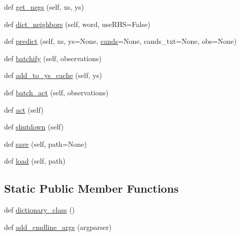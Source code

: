 \begin{DoxyCompactItemize}
\item 
def \hyperlink{classkvmemnn_1_1KvmemnnAgent_aef9979d74efe7a62ac7d4dc8cc661e30}{get\+\_\+negs} (self, xs, ys)
\item 
def \hyperlink{classkvmemnn_1_1KvmemnnAgent_a7bc63414bd5f081ad88caadcc5ec543d}{dict\+\_\+neighbors} (self, word, use\+R\+HS=False)
\item 
def \hyperlink{classkvmemnn_1_1KvmemnnAgent_ac2b07b1455920e6a343271997b9c6207}{predict} (self, xs, ys=None, \hyperlink{classkvmemnn_1_1KvmemnnAgent_a30dfea4410f97b8a0cf44e0a374f3a62}{cands}=None, cands\+\_\+txt=None, obs=None)
\item 
def \hyperlink{classkvmemnn_1_1KvmemnnAgent_ac7dba84c37dab7ef33f52d263fbdbdc7}{batchify} (self, observations)
\item 
def \hyperlink{classkvmemnn_1_1KvmemnnAgent_a0326f13fa94d1e9156e761c14dbcb536}{add\+\_\+to\+\_\+ys\+\_\+cache} (self, ys)
\item 
def \hyperlink{classkvmemnn_1_1KvmemnnAgent_a2a2c0f653125850d739b84e0c55e6796}{batch\+\_\+act} (self, observations)
\item 
def \hyperlink{classkvmemnn_1_1KvmemnnAgent_a6f57723b871277392a3f3fd627c717d8}{act} (self)
\item 
def \hyperlink{classkvmemnn_1_1KvmemnnAgent_a78ec1dfcfa978743700d878d965d0195}{shutdown} (self)
\item 
def \hyperlink{classkvmemnn_1_1KvmemnnAgent_ad60947cc72e11489972472edbb1721fe}{save} (self, path=None)
\item 
def \hyperlink{classkvmemnn_1_1KvmemnnAgent_a4a7c16982a6d0364a6f7eca56734ee0b}{load} (self, path)
\end{DoxyCompactItemize}
\subsection*{Static Public Member Functions}
\begin{DoxyCompactItemize}
\item 
def \hyperlink{classkvmemnn_1_1KvmemnnAgent_a4df5874e77b946e8c92a61c14fc126b4}{dictionary\+\_\+class} ()
\item 
def \hyperlink{classkvmemnn_1_1KvmemnnAgent_a560f704744b9e1040eed00cd23fba59c}{add\+\_\+cmdline\+\_\+args} (argparser)
\end{DoxyCompactItemize}
